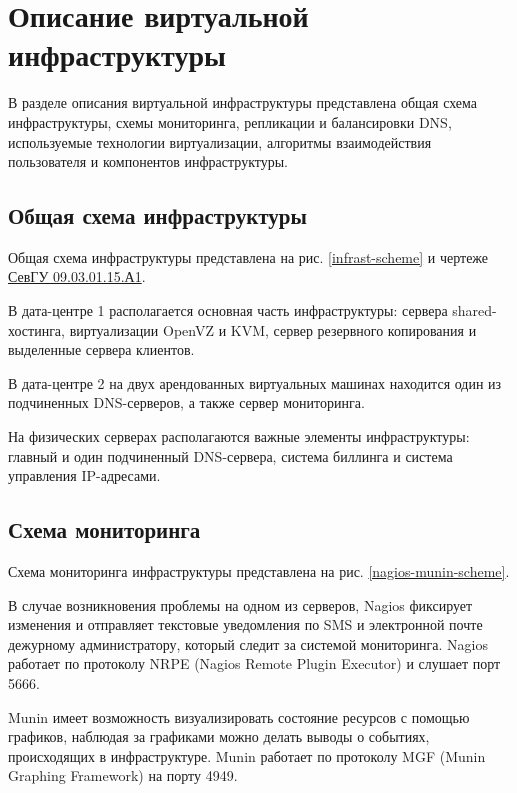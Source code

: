 \section{Описание виртуальной инфраструктуры}

В разделе описания виртуальной инфраструктуры представлена общая схема инфраструктуры, схемы мониторинга, репликации и балансировки DNS, используемые технологии виртуализации, алгоритмы взаимодействия пользователя и компонентов инфраструктуры.

\subsection{Общая схема инфраструктуры}

Общая схема инфраструктуры представлена на рис. \ref{infrast-scheme} и чертеже \href{extra/drafts/SevGU_09.03.01.15.A1.pdf}{СевГУ 09.03.01.15.А1}.

В дата-центре 1 располагается основная часть инфраструктуры: сервера shared-хостинга, виртуализации OpenVZ и KVM, сервер резервного копирования и выделенные сервера клиентов.

В дата-центре 2 на двух арендованных виртуальных машинах находится один из подчиненных DNS-серверов, а также сервер мониторинга.

На физических серверах располагаются важные элементы инфраструктуры: главный и один подчиненный DNS-сервера, система биллинга и система управления IP-адресами.

\subsection{Схема мониторинга}

Схема мониторинга инфраструктуры представлена на рис. \ref{nagios-munin-scheme}.

В случае возникновения проблемы на одном из серверов, Nagios фиксирует изменения и отправляет текстовые уведомления по SMS и электронной почте дежурному администратору, который следит за системой мониторинга.
Nagios работает по протоколу NRPE (Nagios Remote Plugin Executor) и слушает порт 5666.

Munin имеет возможность визуализировать состояние ресурсов с помощью графиков, наблюдая за графиками можно делать выводы о событиях, происходящих в инфраструктуре.
Munin работает по протоколу MGF (Munin Graphing Framework) на порту 4949.

